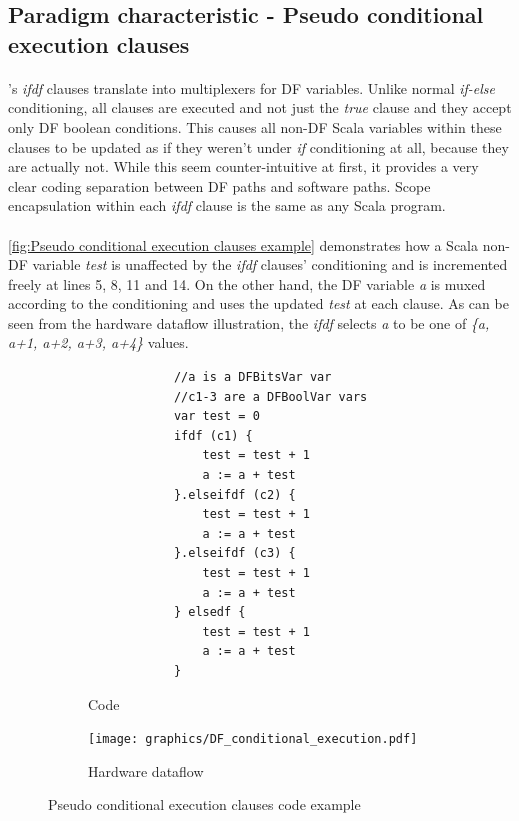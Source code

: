 \newpage
\subsection{Paradigm characteristic - Pseudo conditional execution clauses}
\paragraph{}\cfns's \textit{ifdf} clauses translate into multiplexers for DF variables. Unlike normal \textit{if-else} conditioning, all clauses are executed and not just the \textit{true} clause and they accept only DF boolean conditions. This causes all non-DF Scala variables within these clauses to be updated as if they weren't under \textit{if} conditioning at all, because they are actually not. While this seem counter-intuitive at first, it provides a very clear coding separation between DF paths and software paths. Scope encapsulation within each \textit{ifdf} clause is the same as any Scala program.
\paragraph{}\autoref{fig:Pseudo conditional execution clauses example} demonstrates how a Scala non-DF variable \textit{test} is unaffected by the \textit{ifdf} clauses' conditioning and is incremented freely at lines 5, 8, 11 and 14. On the other hand, the DF variable \textit{a} is muxed according to the conditioning and uses the updated \textit{test} at each clause. As can be seen from the hardware dataflow illustration, the \textit{ifdf} selects \textit{a} to be one of \textit{\{a, a+1, a+2, a+3, a+4\}} values.
\begin{figure}[h]
	\centering
	\begin{subfigure}[b]{0.7\textwidth}
		\begin{verbatim}
			//a is a DFBitsVar var
			//c1-3 are a DFBoolVar vars
			var test = 0	
			ifdf (c1) {
				test = test + 1
				a := a + test
			}.elseifdf (c2) {
				test = test + 1
				a := a + test
			}.elseifdf (c3) {
				test = test + 1
				a := a + test
			} elsedf {
				test = test + 1
				a := a + test
			}
		\end{verbatim}
		\caption{Code}
		\vspace*{4mm}
	\end{subfigure}
	\vfill
	\begin{subfigure}[b]{0.80\textwidth}
		\texttt{[image: graphics/DF\_conditional\_execution.pdf]}
		\caption{Hardware dataflow}
		\vspace*{4mm}
	\end{subfigure}
	\caption{Pseudo conditional execution clauses code example}\label{fig:Pseudo conditional execution clauses example}
\end{figure}



